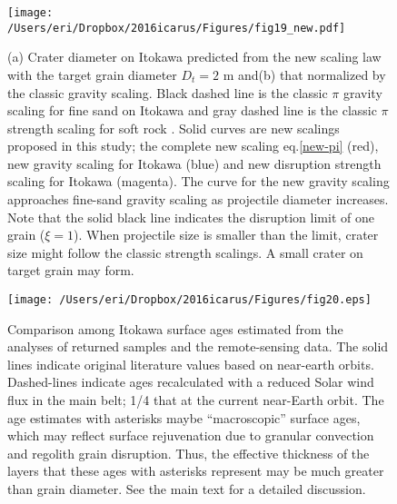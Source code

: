 \documentclass[3p,authoryear]{elsarticle}
\begin{document}
\begin{figure}[htbp]
	\begin{center}
	\texttt{[image: /Users/eri/Dropbox/2016icarus/Figures/fig19\_new.pdf]}
	\caption{(a) Crater diameter on Itokawa predicted from the new scaling law with the target grain diameter $D_t=2$ m and(b) that normalized by the classic gravity scaling. Black dashed line is the classic $\pi$ gravity scaling \citep[e.g.][]{holsapple1993} for fine sand on Itokawa and gray dashed line is the classic $\pi$ strength scaling for soft rock \citep{holsapple1993}. Solid curves are new scalings proposed in this study; the complete new scaling eq.\eqref{new-pi} (red), new gravity scaling for Itokawa (blue) and new disruption strength scaling for Itokawa (magenta).  The curve for the new gravity scaling approaches fine-sand gravity scaling as projectile diameter increases. Note that the solid black line indicates the disruption limit of one grain ($\xi=1$). When projectile size is smaller than the limit, crater size might follow the classic strength scalings. A small crater on target grain may form. }
	\label{Itokawa-crater}
	\end{center}
\end{figure}

\begin{figure}[htbp]
	\centering
	\texttt{[image: /Users/eri/Dropbox/2016icarus/Figures/fig20.eps]}
	\caption{Comparison among Itokawa surface ages estimated from the analyses of returned samples and the remote-sensing data\citep{obrien2005, michel2009, nagao2011, basilevsky2014, koga2014, meier2014, noguchi2014, berger2015, bonal2015, nishiizumi2015, park2015}. The solid lines indicate original literature values based on near-earth orbits. Dashed-lines indicate ages recalculated with a reduced Solar wind flux in the main belt; 1/4 that at the current near-Earth orbit. The age estimates with asterisks maybe ``macroscopic'' surface ages, which may reflect surface rejuvenation due to granular convection and regolith grain disruption. Thus, the effective thickness of the layers that these ages with asterisks represent may be much greater than grain diameter. See the main text for a detailed discussion. }
	\label{itokawa-ages}
	\centering
\end{figure}

\end{document}

